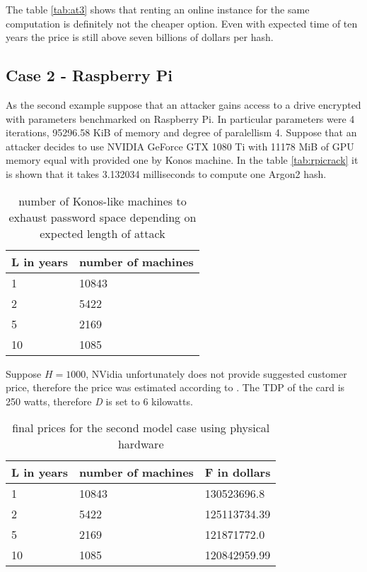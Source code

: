 \documentclass[nolof]{fithesis3}
\begin{document}
The table \ref{tab:at3} shows that renting an online instance for the same computation is definitely not the cheaper option. Even with expected time of ten years the price is still above seven billions of dollars per hash.

\FloatBarrier

\subsection{Case 2 - Raspberry Pi}
As the second example suppose that an attacker gains access to a drive encrypted with parameters benchmarked on Raspberry Pi. In particular parameters were 4 iterations, 95296.58 KiB of memory and degree of paralellism 4. Suppose that an attacker decides to use NVIDIA GeForce GTX 1080 Ti with 11178 MiB of GPU memory equal with provided one by Konos machine. In the table \ref{tab:rpicrack} it is shown that it takes 3.132034 milliseconds to compute one Argon2 hash.

\noindent
\begin{table}
\caption{number of Konos-like machines to exhaust password space depending on expected length of attack}
\label{tab:at4}
\begin{tabularx}{\textwidth}{| X | X |}
\hline
L in years & number of machines\\
\hline
1 & 10843\\	
\hline
2 & 5422\\
\hline
5 & 2169\\
\hline
10 & 1085\\
\hline
\end{tabularx}
\end{table}

Suppose $H = 1000$, NVidia unfortunately does not provide suggested customer price, therefore the price was estimated according to \parencite{geforceprice}. The TDP of the card is 250 watts, therefore \emph{D} is set to 6 kilowatts.

\noindent
\begin{table}
\caption{final prices for the second model case using physical hardware}
\label{tab:at5}
\begin{tabularx}{\textwidth}{| X | X | X |}
\hline
L  in years & number of machines & F in dollars\\
\hline
1 & 10843 & 130523696.8\\
\hline
2 & 5422 & 125113734.39\\
\hline
5 & 2169 & 121871772.0\\
\hline
10 & 1085 & 120842959.99\\
\hline
\end{tabularx}
\end{table}
\end{document}
